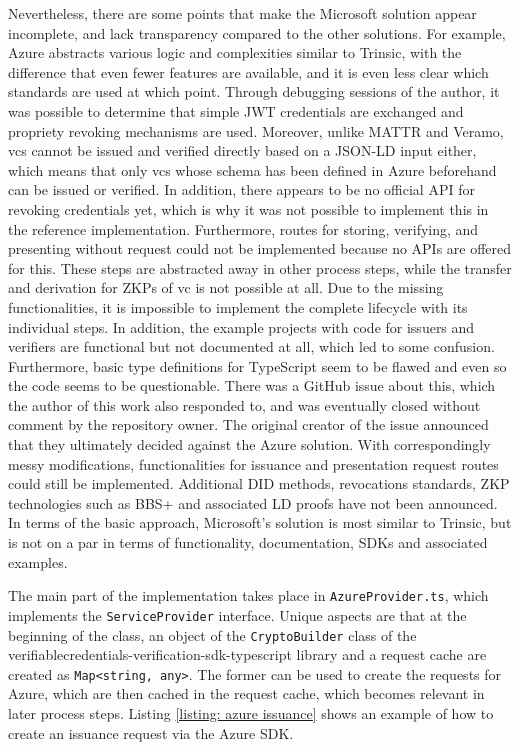         Nevertheless, there are some points that make the Microsoft solution appear incomplete, and lack transparency compared to the other solutions. For example, Azure abstracts various logic and complexities similar to Trinsic, with the difference that even fewer features are available, and it is even less clear which standards are used at which point. Through debugging sessions of the author, it was possible to determine that simple JWT credentials are exchanged and propriety revoking mechanisms are used. Moreover, unlike MATTR and Veramo, \acp{vc} cannot be issued and verified directly based on a JSON-LD input either, which means that only \acp{vc} whose schema has been defined in Azure beforehand can be issued or verified. In addition, there appears to be no official API for revoking credentials yet, which is why it was not possible to implement this in the reference implementation. Furthermore, routes for storing, verifying, and presenting without request could not be implemented because no APIs are offered for this. These steps are abstracted away in other process steps, while the transfer and derivation for ZKPs of \ac{vc} is not possible at all. Due to the missing functionalities, it is impossible to implement the complete lifecycle with its individual steps. In addition, the example projects with code for issuers and verifiers are functional but not documented at all, which led to some confusion. Furthermore, basic type definitions for TypeScript seem to be flawed and even so the code seems to be questionable. There was a GitHub issue \cite{yegupov_demo_2021} about this, which the author of this work also responded to, and was eventually closed without comment by the repository owner. The original creator of the issue announced that they ultimately decided against the Azure solution. With correspondingly messy modifications, functionalities for issuance and presentation request routes could still be implemented. Additional \ac{DID} methods, revocations standards, ZKP technologies such as BBS+ and associated LD proofs have not been announced. In terms of the basic approach, Microsoft's solution is most similar to Trinsic, but is not on a par in terms of functionality, documentation, SDKs and associated examples.

        The main part of the implementation takes place in \texttt{AzureProvider.ts}, which implements the \texttt{ServiceProvider} interface. Unique aspects are that at the beginning of the class, an object of the \texttt{CryptoBuilder} class of the verifiablecredentials-verification-sdk-typescript library and a request cache are created as \texttt{Map<string, any>}. The former can be used to create the requests for Azure, which are then cached in the request cache, which becomes relevant in later process steps. Listing \ref{listing: azure issuance} shows an example of how to create an issuance request via the Azure SDK.
        \newline
        
